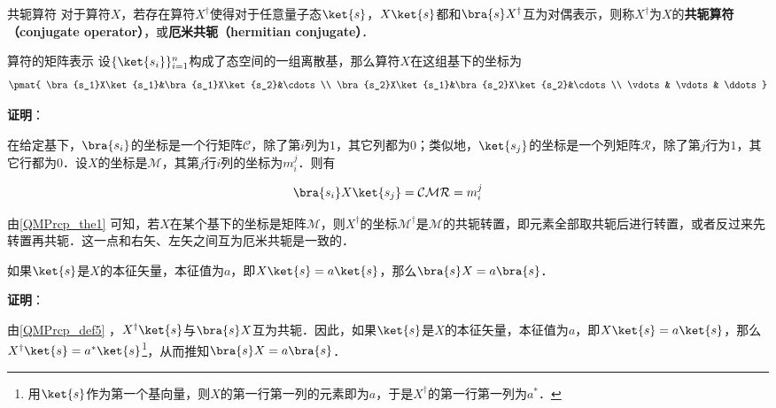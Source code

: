 \begin{definition}{共轭算符}\label{QMPrcp_def5}
对于算符$X$，若存在算符$X^\dagger$使得对于任意量子态$\ket{s}$，$X\ket{s}$都和$\bra{s}X^\dagger$互为对偶表示，则称$X^\dagger$为$X$的\textbf{共轭算符（conjugate operator）}，或\textbf{厄米共轭（hermitian conjugate）}．
\end{definition}





\begin{theorem}{算符的矩阵表示}\label{QMPrcp_the1}
设$\{\ket{s_i}\}_{i=1}^n$构成了态空间的一组离散基，那么算符$X$在这组基下的坐标为
\begin{equation}
\pmat{
    \bra{s_1}X\ket{s_1}&\bra{s_1}X\ket{s_2}&\cdots\\
    \bra{s_2}X\ket{s_1}&\bra{s_2}X\ket{s_2}&\cdots\\
    \vdots & \vdots& \ddots
}
\end{equation}
\end{theorem}

\textbf{证明}：

在给定基下，$\bra{s_i}$的坐标是一个行矩阵$\mathcal{C}$，除了第$i$列为$1$，其它列都为$0$；类似地，$\ket{s_j}$的坐标是一个列矩阵$\mathcal{R}$，除了第$j$行为$1$，其它行都为$0$．设$X$的坐标是$\mathcal{M}$，其第$j$行$i$列的坐标为$m^j_i$．则有

\begin{equation}
\bra{s_i}X\ket{s_j} = \mathcal{CMR} = m^j_i
\end{equation}







由\autoref{QMPrcp_the1} 可知，若$X$在某个基下的坐标是矩阵$\mathcal{M}$，则$X^\dagger$的坐标$\mathcal{M}^\dagger$是$\mathcal{M}$的共轭转置，即元素全部取共轭后进行转置，或者反过来先转置再共轭．这一点和右矢、左矢之间互为厄米共轭是一致的．






\begin{lemma}{}\label{QMPrcp_lem1}
如果$\ket{s}$是$X$的本征矢量，本征值为$a$，即$X\ket{s}=a\ket{s}$，那么$\bra{s}X=a\bra{s}$．
\end{lemma}

\textbf{证明}：

由\autoref{QMPrcp_def5} ，$X^\dagger\ket{s}$与$\bra{s}X$互为共轭．因此，如果$\ket{s}$是$X$的本征矢量，本征值为$a$，即$X\ket{s}=a\ket{s}$，那么$X^\dagger\ket{s}=a^*\ket{s}$\footnote{用$\ket{s}$作为第一个基向量，则$X$的第一行第一列的元素即为$a$，于是$X^\dagger$的第一行第一列为$a^*$．}，从而推知$\bra{s}X=a\bra{s}$．

